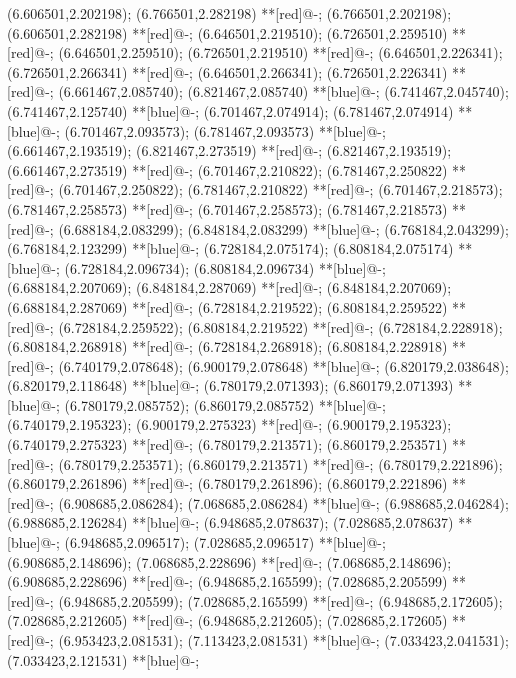 (6.606501,2.202198); (6.766501,2.282198) **[red]@{-};
(6.766501,2.202198); (6.606501,2.282198) **[red]@{-};
(6.646501,2.219510); (6.726501,2.259510) **[red]@{-};
(6.646501,2.259510); (6.726501,2.219510) **[red]@{-};
(6.646501,2.226341); (6.726501,2.266341) **[red]@{-};
(6.646501,2.266341); (6.726501,2.226341) **[red]@{-};
(6.661467,2.085740); (6.821467,2.085740) **[blue]@{-};
(6.741467,2.045740); (6.741467,2.125740) **[blue]@{-};
(6.701467,2.074914); (6.781467,2.074914) **[blue]@{-};
(6.701467,2.093573); (6.781467,2.093573) **[blue]@{-};
(6.661467,2.193519); (6.821467,2.273519) **[red]@{-};
(6.821467,2.193519); (6.661467,2.273519) **[red]@{-};
(6.701467,2.210822); (6.781467,2.250822) **[red]@{-};
(6.701467,2.250822); (6.781467,2.210822) **[red]@{-};
(6.701467,2.218573); (6.781467,2.258573) **[red]@{-};
(6.701467,2.258573); (6.781467,2.218573) **[red]@{-};
(6.688184,2.083299); (6.848184,2.083299) **[blue]@{-};
(6.768184,2.043299); (6.768184,2.123299) **[blue]@{-};
(6.728184,2.075174); (6.808184,2.075174) **[blue]@{-};
(6.728184,2.096734); (6.808184,2.096734) **[blue]@{-};
(6.688184,2.207069); (6.848184,2.287069) **[red]@{-};
(6.848184,2.207069); (6.688184,2.287069) **[red]@{-};
(6.728184,2.219522); (6.808184,2.259522) **[red]@{-};
(6.728184,2.259522); (6.808184,2.219522) **[red]@{-};
(6.728184,2.228918); (6.808184,2.268918) **[red]@{-};
(6.728184,2.268918); (6.808184,2.228918) **[red]@{-};
(6.740179,2.078648); (6.900179,2.078648) **[blue]@{-};
(6.820179,2.038648); (6.820179,2.118648) **[blue]@{-};
(6.780179,2.071393); (6.860179,2.071393) **[blue]@{-};
(6.780179,2.085752); (6.860179,2.085752) **[blue]@{-};
(6.740179,2.195323); (6.900179,2.275323) **[red]@{-};
(6.900179,2.195323); (6.740179,2.275323) **[red]@{-};
(6.780179,2.213571); (6.860179,2.253571) **[red]@{-};
(6.780179,2.253571); (6.860179,2.213571) **[red]@{-};
(6.780179,2.221896); (6.860179,2.261896) **[red]@{-};
(6.780179,2.261896); (6.860179,2.221896) **[red]@{-};
(6.908685,2.086284); (7.068685,2.086284) **[blue]@{-};
(6.988685,2.046284); (6.988685,2.126284) **[blue]@{-};
(6.948685,2.078637); (7.028685,2.078637) **[blue]@{-};
(6.948685,2.096517); (7.028685,2.096517) **[blue]@{-};
(6.908685,2.148696); (7.068685,2.228696) **[red]@{-};
(7.068685,2.148696); (6.908685,2.228696) **[red]@{-};
(6.948685,2.165599); (7.028685,2.205599) **[red]@{-};
(6.948685,2.205599); (7.028685,2.165599) **[red]@{-};
(6.948685,2.172605); (7.028685,2.212605) **[red]@{-};
(6.948685,2.212605); (7.028685,2.172605) **[red]@{-};
(6.953423,2.081531); (7.113423,2.081531) **[blue]@{-};
(7.033423,2.041531); (7.033423,2.121531) **[blue]@{-};
